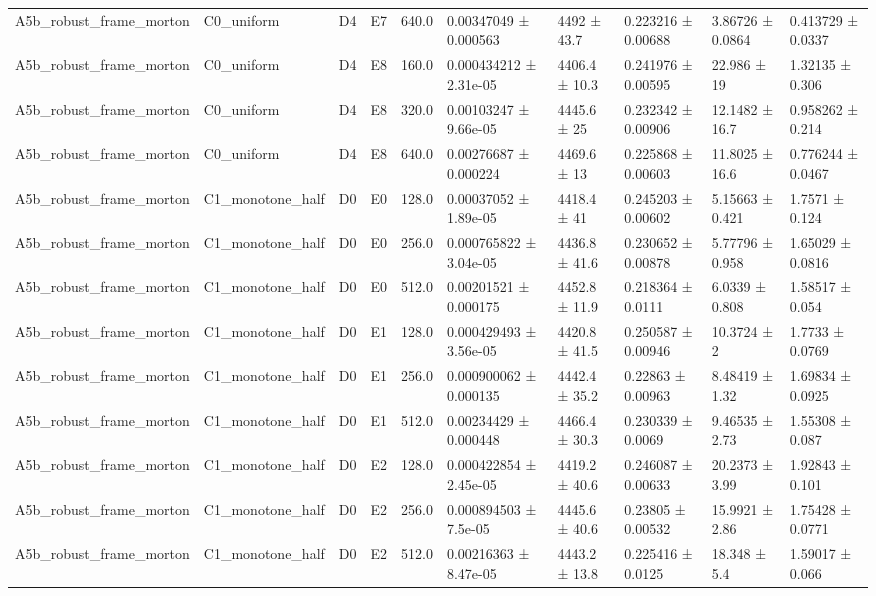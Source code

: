 \begin{table}
\begin{tabular}{llllllllll}
A5b\_robust\_frame\_morton & C0\_uniform & D4 & E7 & 640.0 & 0.00347049 ± 0.000563 & 4492 ± 43.7 & 0.223216 ± 0.00688 & 3.86726 ± 0.0864 & 0.413729 ± 0.0337 \\
A5b\_robust\_frame\_morton & C0\_uniform & D4 & E8 & 160.0 & 0.000434212 ± 2.31e-05 & 4406.4 ± 10.3 & 0.241976 ± 0.00595 & 22.986 ± 19 & 1.32135 ± 0.306 \\
A5b\_robust\_frame\_morton & C0\_uniform & D4 & E8 & 320.0 & 0.00103247 ± 9.66e-05 & 4445.6 ± 25 & 0.232342 ± 0.00906 & 12.1482 ± 16.7 & 0.958262 ± 0.214 \\
A5b\_robust\_frame\_morton & C0\_uniform & D4 & E8 & 640.0 & 0.00276687 ± 0.000224 & 4469.6 ± 13 & 0.225868 ± 0.00603 & 11.8025 ± 16.6 & 0.776244 ± 0.0467 \\
A5b\_robust\_frame\_morton & C1\_monotone\_half & D0 & E0 & 128.0 & 0.00037052 ± 1.89e-05 & 4418.4 ± 41 & 0.245203 ± 0.00602 & 5.15663 ± 0.421 & 1.7571 ± 0.124 \\
A5b\_robust\_frame\_morton & C1\_monotone\_half & D0 & E0 & 256.0 & 0.000765822 ± 3.04e-05 & 4436.8 ± 41.6 & 0.230652 ± 0.00878 & 5.77796 ± 0.958 & 1.65029 ± 0.0816 \\
A5b\_robust\_frame\_morton & C1\_monotone\_half & D0 & E0 & 512.0 & 0.00201521 ± 0.000175 & 4452.8 ± 11.9 & 0.218364 ± 0.0111 & 6.0339 ± 0.808 & 1.58517 ± 0.054 \\
A5b\_robust\_frame\_morton & C1\_monotone\_half & D0 & E1 & 128.0 & 0.000429493 ± 3.56e-05 & 4420.8 ± 41.5 & 0.250587 ± 0.00946 & 10.3724 ± 2 & 1.7733 ± 0.0769 \\
A5b\_robust\_frame\_morton & C1\_monotone\_half & D0 & E1 & 256.0 & 0.000900062 ± 0.000135 & 4442.4 ± 35.2 & 0.22863 ± 0.00963 & 8.48419 ± 1.32 & 1.69834 ± 0.0925 \\
A5b\_robust\_frame\_morton & C1\_monotone\_half & D0 & E1 & 512.0 & 0.00234429 ± 0.000448 & 4466.4 ± 30.3 & 0.230339 ± 0.0069 & 9.46535 ± 2.73 & 1.55308 ± 0.087 \\
A5b\_robust\_frame\_morton & C1\_monotone\_half & D0 & E2 & 128.0 & 0.000422854 ± 2.45e-05 & 4419.2 ± 40.6 & 0.246087 ± 0.00633 & 20.2373 ± 3.99 & 1.92843 ± 0.101 \\
A5b\_robust\_frame\_morton & C1\_monotone\_half & D0 & E2 & 256.0 & 0.000894503 ± 7.5e-05 & 4445.6 ± 40.6 & 0.23805 ± 0.00532 & 15.9921 ± 2.86 & 1.75428 ± 0.0771 \\
A5b\_robust\_frame\_morton & C1\_monotone\_half & D0 & E2 & 512.0 & 0.00216363 ± 8.47e-05 & 4443.2 ± 13.8 & 0.225416 ± 0.0125 & 18.348 ± 5.4 & 1.59017 ± 0.066 \\

\end{tabular}
\end{table}
